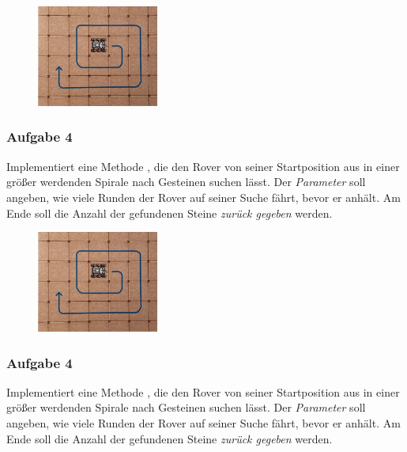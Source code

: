 \documentclass[10pt, a4paper]{scrartcl}
\begin{document}
\begin{wrapfig}
	\begin{figure}
		\includegraphics[width=4cm]{EF-AB.8-Abb_Spirale}
	\end{figure}
	
	\subsubsection*{Aufgabe 4}
	Implementiert eine Methode , die den Rover von seiner Startposition aus in einer größer werdenden Spirale nach Gesteinen suchen lässt. Der \emph{Parameter}  soll angeben, wie viele Runden der Rover auf seiner Suche fährt, bevor er anhält. Am Ende soll die Anzahl der gefundenen Steine \emph{zurück gegeben} werden.
\end{wrapfig}

\vspace{1cm}
\titlerule
\vspace{1cm}

\begin{wrapfig}
	\begin{figure}
		\includegraphics[width=4cm]{EF-AB.8-Abb_Spirale}
	\end{figure}
	
	\subsubsection*{Aufgabe 4}
	Implementiert eine Methode , die den Rover von seiner Startposition aus in einer größer werdenden Spirale nach Gesteinen suchen lässt. Der \emph{Parameter}  soll angeben, wie viele Runden der Rover auf seiner Suche fährt, bevor er anhält. Am Ende soll die Anzahl der gefundenen Steine \emph{zurück gegeben} werden.
\end{wrapfig}
\end{document}

